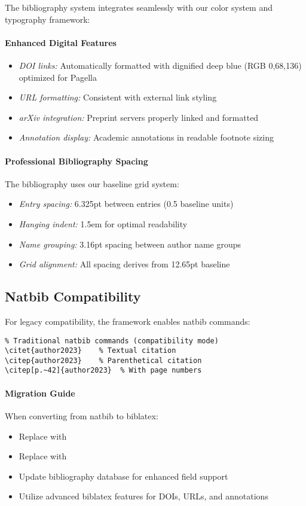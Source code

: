 \documentclass[11pt]{article}
\begin{document}
The bibliography system integrates seamlessly with our color system and typography framework:

\paragraph{Enhanced Digital Features}
\begin{itemize}
\item \emph{DOI links:} Automatically formatted with dignified deep blue (RGB 0,68,136) optimized for Pagella
\item \emph{URL formatting:} Consistent with external link styling
\item \emph{arXiv integration:} Preprint servers properly linked and formatted
\item \emph{Annotation display:} Academic annotations in readable footnote sizing
\end{itemize}

\paragraph{Professional Bibliography Spacing}
The bibliography uses our baseline grid system:
\begin{itemize}
\item \emph{Entry spacing:} 6.325pt between entries (0.5 baseline units)
\item \emph{Hanging indent:} 1.5em for optimal readability
\item \emph{Name grouping:} 3.16pt spacing between author name groups
\item \emph{Grid alignment:} All spacing derives from 12.65pt baseline
\end{itemize}

\subsection{Natbib Compatibility}

For legacy compatibility, the framework enables natbib commands:

\begin{verbatim}
% Traditional natbib commands (compatibility mode)
\citet{author2023}    % Textual citation
\citep{author2023}    % Parenthetical citation
\citep[p.~42]{author2023}  % With page numbers
\end{verbatim}

\paragraph{Migration Guide} When converting from natbib to biblatex:
\begin{itemize}
\item Replace  with 
\item Replace  with 
\item Update bibliography database for enhanced field support
\item Utilize advanced biblatex features for DOIs, URLs, and annotations
\end{itemize}
\end{document}
